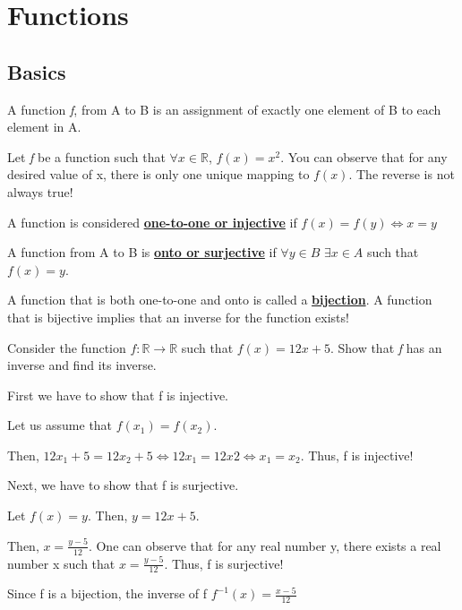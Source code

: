 \chapter{Functions}
\section{Basics}
A function \emph{f}, from A to B is an assignment of exactly one element of B
to each element in A.

\begin{example}
    Let \emph{f} be a function such that $\forall x \in \mathbb{R}$, $f(x) =
    x^{2}$. You can observe that for any desired value of x, there is only one
    unique mapping to $f(x)$. The reverse is not always true!
\end{example}

\begin{definition}
    A function is considered \textbf{\underline{one-to-one or injective}} if
    $f(x) = f(y) \Leftrightarrow x = y$
\end{definition}

\begin{definition}
    A function from A to B is \textbf{\underline{onto or surjective}} if $\forall y
    \in B$ $\exists x \in A$ such that $f(x) = y$.
\end{definition}

\begin{definition}
    A function that is both one-to-one and onto is called a
    \textbf{\underline{bijection}}. A function that is bijective implies that
    an inverse for the function exists!
\end{definition}

\begin{example}
    Consider the function $f:\mathbb{R} \rightarrow \mathbb{R}$ such that $f(x)
    = 12x + 5$. Show that \emph{f} has an inverse and find its inverse.
\end{example}

\begin{solution}
    First we have to show that f is injective.

    Let us assume that $f(x_{1}) = f(x_{2})$.

    Then, $12x_{1} + 5 = 12x_{2} + 5 \Leftrightarrow 12x_{1} = 12{x2}
    \Leftrightarrow x_{1} = x_{2}$. Thus, f is injective!

    Next, we have to show that f is surjective.

    Let $f(x) = y$. Then, $y = 12x + 5$.

    Then, $x = \frac{y - 5}{12}$. One can observe that for any real number y,
    there exists a real number x such that $x = \frac{y - 5}{12}$. Thus, f is
    surjective!

    Since f is a bijection, the inverse of f $f^{-1}(x) = \frac{x - 5}{12}$
\end{solution}

